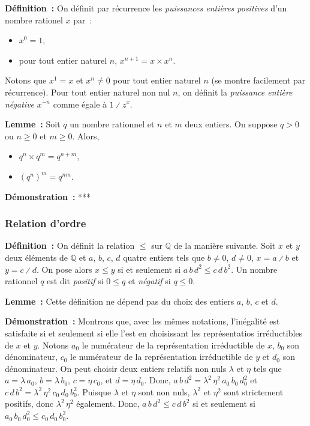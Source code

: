 \noindent\textbf{Définition :} On définit par récurrence les \emph{puissances entières positives} d'un nombre rationel $x$ par :
    \begin{itemize}[nosep]
        \item $x^0 = 1$,
        \item pour tout entier naturel $n$, $x^{n+1} = x \times x^n$.
    \end{itemize}
    Notons que $x^1 = x$ et $x^n \neq 0$ pour tout entier naturel $n$ (se montre facilement par récurrence).
    Pour tout entier naturel non nul $n$, on définit la \emph{puissance entière négative} $x^{-n}$ comme égale à $1 \divslash z^x$.

\medskip

\noindent\textbf{Lemme :} Soit $q$ un nombre rationnel et $n$ et $m$ deux entiers. 
    On suppose $q > 0$ ou $n \geq 0$ et $m \geq 0$.
    Alors, 
    \begin{itemize}[nosep]
        \item $q^n \times q^m = q^{n+m}$,
        \item $(q^n)^m = q^{n m}$.
    \end{itemize}

\medskip

\noindent\textbf{Démonstration :} ***

\subsubsection{Relation d'ordre}

\noindent\textbf{Définition :} On définit la relation $\leq$ sur $\mathbb{Q}$ de la manière suivante. 
    Soit $x$ et $y$ deux éléments de $\mathbb{Q}$ et $a$, $b$, $c$, $d$ quatre entiers tels que $b \neq 0$, $d \neq 0$, $x = a \divslash b$ et $y = c \divslash d$.
    On pose alors $x \leq y$ si et seulement si $a \, b \, d^2 \leq c \, d \, b^2$.
    Un nombre rationnel $q$ est dit \emph{positif} si $0 \leq q$ et \emph{négatif} si $q \leq 0$.

\medskip

\noindent\textbf{Lemme :} Cette définition ne dépend pas du choix des entiers $a$, $b$, $c$ et $d$.

\medskip

\noindent\textbf{Démonstration :} 
    Montrons que, avec les mêmes notations, l'inégalité est satisfaite si et seulement si elle l'est en choisissant les représentatios irréductibles de $x$ et $y$.
    Notons $a_0$ le numérateur de la représentation irréductible de $x$, $b_0$ son dénominateur, $c_0$ le numérateur de la représentation irréductible de $y$ et $d_0$ son dénominateur.
    On peut choisir deux entiers relatifs non nuls $\lambda$ et $\eta$ tels que $a = \lambda \, a_0$, $b = \lambda \, b_0$, $c = \eta \, c_0$, et $d = \eta \, d_0$.
    Donc, $a \, b \, d^2 = \lambda^2 \, \eta^2 \, a_0 \, b_0 \, d_0^2$ et $c \, d \, b^2 = \lambda^2 \, \eta^2 \, c_0 \, d_0 \, b_0^2$.
    Puisque $\lambda$ et $\eta$ sont non nuls, $\lambda^2$ et $\eta^2$ sont strictement positifs, donc $\lambda^2 \, \eta^2$ également.
    Donc, $a \, b \, d^2 \leq c \, d \, b^2$ si et seulement si $a_0 \, b_0 \, d_0^2 \leq c_0 \, d_0 \, b_0^2$.
    
